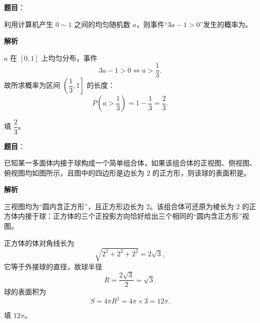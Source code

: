 \begin{answer}

\textbf{题目}：

利用计算机产生 $0\sim1$ 之间的均匀随机数 $a$，则事件“$3a-1>0$”发生的概率为\gkblank{}。

\textbf{解析}

$a$ 在 $[0,1]$ 上均匀分布，事件
\nopagebreak[4]
\[3a-1>0\Longleftrightarrow a>\frac13.\]
故所求概率为区间 $\left(\dfrac13,1\right]$ 的长度：
\nopagebreak[4]
\[P\left(a>\frac13\right)=1-\frac13=\frac23.\]

填 $\dfrac23$。


\end{answer}
\begin{answer}

\textbf{题目}：

已知某一多面体内接于球构成一个简单组合体，如果该组合体的正视图、侧视图、俯视图均如图所示，且图中的四边形是边长为 $2$ 的正方形，则该球的表面积是\gkblank{}。
\nopagebreak[4]
\begin{center}\end{center}
\nopagebreak[4]
\textbf{解析}

三视图均为“圆内含正方形”，且正方形边长为 $2$。该组合体可还原为棱长为 $2$ 的正方体内接于球：正方体的三个正投影方向恰好给出三个相同的“圆内含正方形”视图。

正方体的体对角线长为
\nopagebreak[4]
\[\sqrt{2^2+2^2+2^2}=2\sqrt3,\]
它等于外接球的直径，故球半径
\nopagebreak[4]
\[R=\frac{2\sqrt3}{2}=\sqrt3.\]
球的表面积为
\nopagebreak[4]
\[S=4\pi R^2=4\pi\times3=12\pi.\]

填 $12\pi$。


\end{answer}
